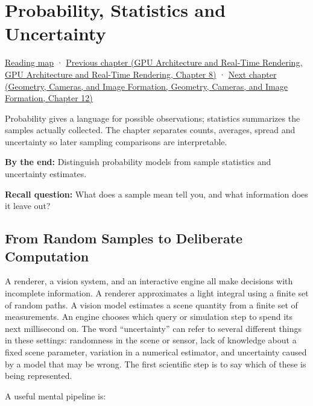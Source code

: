 \hypertarget{03-visual-computing-i-ch012}{}
\chapter{Probability, Statistics and Uncertainty}\label{stagechapter:03-visual-computing-i-ch012}\label{03-visual-computing-i-ch012-probability-statistics-and-uncertainty}

\hyperref[volume-reading-map]{Reading map} · \href{../06-GPU-Architecture-and-Real-Time-Rendering/main.pdf\#nameddest=03-visual-computing-i-ch011-bvh-traversal-and-deterministic-evidence}{Previous chapter (GPU Architecture and Real-Time Rendering, GPU Architecture and Real-Time Rendering, Chapter 8)} · \href{../03-Geometry-Cameras-and-Image-Formation/main.pdf\#nameddest=03-visual-computing-i-ch013-from-view-space-to-clip-space}{Next chapter (Geometry, Cameras, and Image Formation, Geometry, Cameras, and Image Formation, Chapter 12)}

Probability gives a language for possible observations; statistics summarizes the samples actually collected. The chapter separates counts, averages, spread and uncertainty so later sampling comparisons are interpretable.

\textbf{By the end:} Distinguish probability models from sample statistics and uncertainty estimates.

\textbf{Recall question:} What does a sample mean tell you, and what information does it leave out?

\section{From Random Samples to Deliberate Computation}\label{03-visual-computing-i-ch012-from-random-samples-to-deliberate-computation}

A renderer, a vision system, and an interactive engine all make decisions with incomplete information. A renderer approximates a light integral using a finite set of random paths. A vision model estimates a scene quantity from a finite set of measurements. An engine chooses which query or simulation step to spend its next millisecond on. The word ``uncertainty'' can refer to several different things in these settings: randomness in the scene or sensor, lack of knowledge about a fixed scene parameter, variation in a numerical estimator, and uncertainty caused by a model that may be wrong. The first scientific step is to say which of these is being represented.

A useful mental pipeline is:

